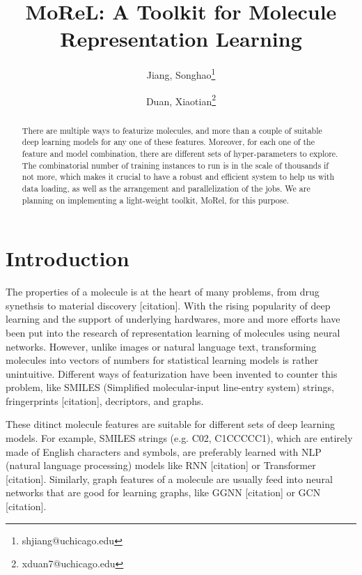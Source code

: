 \documentclass[10pt,twocolumn]{article}
\begin{document}
\title{MoReL: A Toolkit for Molecule Representation Learning }


\author[ ]{Jiang, Songhao\thanks{shjiang@uchicago.edu}}
\author[ ]{Duan, Xiaotian\thanks{xduan7@uchicago.edu}}

\maketitle
\thispagestyle{empty}

\begin{abstract}

There are multiple ways to featurize molecules, and more than a couple of suitable deep learning models for any one of these features. Moreover, for each one of the feature and model combination, there are different sets of hyper-parameters to explore. The combinatorial number of training instances to run is in the scale of thousands if not more, which makes it crucial to have a robust and efficient system to help us with data loading, as well as the arrangement and parallelization of the jobs. 
We are planning on implementing a light-weight toolkit, MoRel, for this purpose. 

\end{abstract}


\section{Introduction}

The properties of a molecule is at the heart of many problems, from drug synethsis to material discovery [citation]. 
With the rising popularity of deep learning and the support of underlying hardwares, more and more efforts have been put into the research of representation learning of molecules using neural networks. 
However, unlike images or natural language text, transforming molecules into vectors of numbers for statistical learning models is rather unintuitive. Different ways of featurization have been invented to counter this problem, like SMILES (Simplified molecular-input line-entry system) strings, fringerprints [citation], decriptors, and graphs. 

These ditinct molecule features are suitable for different sets of deep learning models. 
For example, SMILES strings (e.g. C02, C1CCCCC1), which are entirely made of English characters and symbols, are preferably learned with NLP (natural language processing) models like RNN [citation] or Transformer [citation]. 
Similarly, graph features of a molecule are usually feed into neural networks that are good for learning graphs, like GGNN [citation] or GCN [citation]. 
\end{document}
